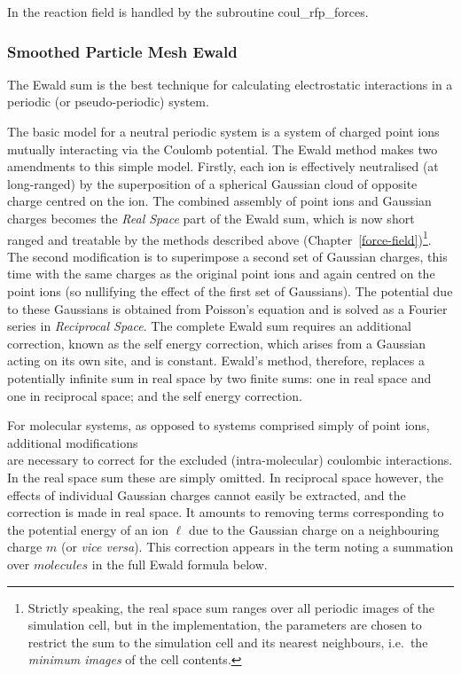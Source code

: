 In \D the reaction field is handled by the
subroutine {\sc coul\_rfp\_forces}.

\subsubsection{Smoothed Particle Mesh Ewald}
\label{SPME}

The Ewald sum \cite{allen-89a} is the best
technique for calculating electrostatic interactions in a periodic
(or pseudo-periodic) system.

The basic model for a neutral periodic system is a system of
charged point ions mutually interacting via the Coulomb potential.
The Ewald method makes two amendments to this simple model.
Firstly, each ion is effectively neutralised (at long-ranged) by the
superposition of a spherical Gaussian
cloud of opposite charge centred on the ion.  The combined
assembly of point ions and Gaussian
charges becomes the {\em Real Space} part of the Ewald
sum, which is now short ranged and
treatable by the methods described above
(Chapter~\ref{force-field})\footnote{Strictly speaking, the real space sum
ranges over all periodic images of the simulation cell, but in the
\D implementation, the parameters are chosen to restrict the sum
to the simulation cell and its nearest neighbours, i.e.~the {\em
minimum images} of the cell contents.}.  The second modification
is to superimpose a second set of Gaussian charges, this time with
the same charges as the original point ions and again centred on
the point ions (so nullifying the effect of the first set of
Gaussians).  The potential due to these
Gaussians is obtained from Poisson's
equation and is solved as a Fourier series in {\em Reciprocal
Space}.  The complete Ewald sum requires an
additional correction, known as the self energy correction, which
arises from a Gaussian acting on its
own site, and is constant.  Ewald's method, therefore, replaces a
potentially infinite sum in real space by two finite sums: one in
real space and one in reciprocal space; and the self energy
correction.

For molecular systems, as opposed to systems comprised simply of
point ions, additional modifications \\ 
are necessary to correct for the excluded (intra-molecular)
coulombic interactions.  In the real space sum these are simply
omitted.  In reciprocal space however, the effects of individual
Gaussian charges cannot easily be
extracted, and the correction is made in real space.  It amounts
to removing terms corresponding to the potential energy of an ion
$\ell$ due to the Gaussian charge on a
neighbouring charge $m$ (or {\em vice versa}).  This correction
appears in the term noting a summation over $molecules$ in the
full Ewald formula below.

